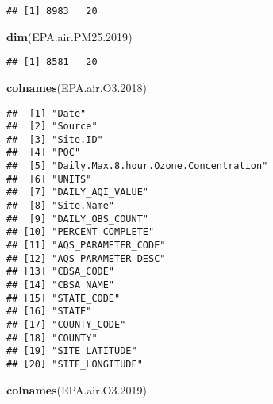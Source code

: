\documentclass[]{article}
\newenvironment{Shaded}{\begin{snugshade}}{\end{snugshade}}
\newcommand{\FloatTok}[1]{\textcolor[rgb]{0.00,0.00,0.81}{#1}}
\newcommand{\KeywordTok}[1]{\textcolor[rgb]{0.13,0.29,0.53}{\textbf{#1}}}
\newcommand{\NormalTok}[1]{#1}
\begin{document}
\begin{verbatim}
## [1] 8983   20
\end{verbatim}

\begin{Shaded}
\begin{Highlighting}[]
\KeywordTok{dim}\NormalTok{(EPA.air.PM25}\FloatTok{.2019}\NormalTok{)}
\end{Highlighting}
\end{Shaded}

\begin{verbatim}
## [1] 8581   20
\end{verbatim}

\begin{Shaded}
\begin{Highlighting}[]
\KeywordTok{colnames}\NormalTok{(EPA.air.O3}\FloatTok{.2018}\NormalTok{)}
\end{Highlighting}
\end{Shaded}

\begin{verbatim}
##  [1] "Date"                                
##  [2] "Source"                              
##  [3] "Site.ID"                             
##  [4] "POC"                                 
##  [5] "Daily.Max.8.hour.Ozone.Concentration"
##  [6] "UNITS"                               
##  [7] "DAILY_AQI_VALUE"                     
##  [8] "Site.Name"                           
##  [9] "DAILY_OBS_COUNT"                     
## [10] "PERCENT_COMPLETE"                    
## [11] "AQS_PARAMETER_CODE"                  
## [12] "AQS_PARAMETER_DESC"                  
## [13] "CBSA_CODE"                           
## [14] "CBSA_NAME"                           
## [15] "STATE_CODE"                          
## [16] "STATE"                               
## [17] "COUNTY_CODE"                         
## [18] "COUNTY"                              
## [19] "SITE_LATITUDE"                       
## [20] "SITE_LONGITUDE"
\end{verbatim}

\begin{Shaded}
\begin{Highlighting}[]
\KeywordTok{colnames}\NormalTok{(EPA.air.O3}\FloatTok{.2019}\NormalTok{)}
\end{Highlighting}
\end{Shaded}
\end{document}
